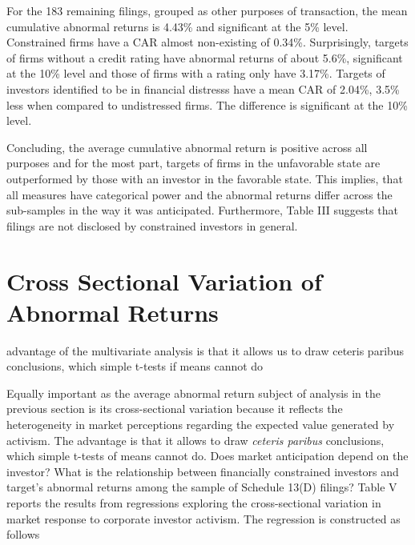 \documentclass[12pt]{article}
\begin{document}
For the 183 remaining filings, grouped as other purposes of transaction, the mean cumulative abnormal returns is 4.43\% and significant at the 5\% level. Constrained firms have a CAR almost non-existing of 0.34\%. Surprisingly, targets of firms without a credit rating have abnormal returns of about 5.6\%, significant at the 10\% level and those of firms with a rating only have 3.17\%. 
Targets of investors identified to be in financial distresss have a mean CAR of 2.04\%, 3.5\% less when compared to undistressed firms. The difference is significant at the 10\% level. 

Concluding, the average cumulative abnormal return is positive across all purposes and for the most part, targets of firms in the unfavorable state are outperformed by those with an investor in the favorable state. This implies, that all measures have categorical power and the abnormal returns differ across the sub-samples in the way it was anticipated. Furthermore, Table III suggests that filings are not disclosed by constrained investors in general. 

\section{Cross Sectional Variation of Abnormal Returns}

\begin{center}
	advantage of the multivariate analysis is that it allows us to draw ceteris paribus conclusions, which simple t-tests if means cannot do \citep[p.111]{Khatami2014}
\end{center}

Equally important as the average abnormal return subject of analysis in the previous section is its cross-sectional variation because it reflects the heterogeneity in market perceptions regarding the expected value generated by activism.  The advantage is that it allows to draw \emph{ceteris paribus} conclusions, which simple t-tests of means cannot do. Does market anticipation depend on the investor? What is the relationship between financially constrained investors and target's abnormal returns among the sample of Schedule 13(D) filings? Table V reports the results from regressions exploring the cross-sectional variation in market response to corporate investor activism. The regression is constructed as follows 
\end{document}
